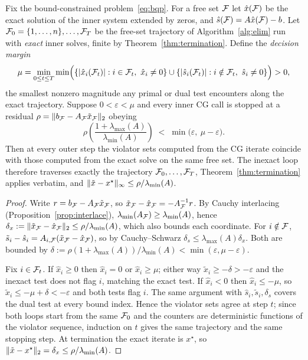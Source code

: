 \begin{lemma}
\label{lem:inexact}
Fix the bound-constrained problem~\eqref{eq:bqp}. For a free set $\mathcal{F}$ let
$\hat x(\mathcal{F})$ be the exact solution of the inner system extended by zeros, and
$\hat s(\mathcal{F}) = A\hat x(\mathcal{F}) - b$. Let $\mathcal{F}_0 = \{1,\dots,n\}, \dots, \mathcal{F}_T$
be the free-set trajectory of Algorithm~\ref{alg:elim} run with \emph{exact} inner
solves, finite by Theorem~\ref{thm:termination}. Define the \emph{decision margin}
\[
  \mu = \min_{0 \le t \le T} \min\Bigl(
    \{ |\hat x_i(\mathcal{F}_t)| : i \in \mathcal{F}_t,\ \hat x_i \ne 0 \}
    \cup
    \{ |\hat s_i(\mathcal{F}_t)| : i \notin \mathcal{F}_t,\ \hat s_i \ne 0 \}
  \Bigr) > 0,
\]
the smallest nonzero magnitude any primal or dual test encounters along the exact
trajectory. Suppose $0 < \varepsilon < \mu$ and every inner CG call is stopped at a
residual $\rho = \lVert b_{\mathcal{F}} - A_{\mathcal{F}}\tilde x_{\mathcal{F}} \rVert_2$ obeying
\begin{equation}
  \rho\left(\frac{1 + \lambda_{\max}(A)}{\lambda_{\min}(A)}\right)
  \;<\; \min\bigl(\varepsilon,\ \mu - \varepsilon\bigr).
  \label{eq:inexactcond}
\end{equation}
Then at every outer step the violator sets computed from the CG iterate coincide
with those computed from the exact solve on the same free set. The inexact loop
therefore traverses exactly the trajectory $\mathcal{F}_0,\dots,\mathcal{F}_T$,
Theorem~\ref{thm:termination} applies verbatim, and
$\lVert \tilde x - x^\star \rVert_\infty \le \rho/\lambda_{\min}(A)$.
\end{lemma}

\begin{proof}
Write $r = b_{\mathcal{F}} - A_{\mathcal{F}}\tilde x_{\mathcal{F}}$, so
$\tilde x_{\mathcal{F}} - \hat x_{\mathcal{F}} = -A_{\mathcal{F}}^{-1}r$. By Cauchy interlacing
(Proposition~\ref{prop:interlace}), $\lambda_{\min}(A_{\mathcal{F}}) \ge \lambda_{\min}(A)$,
hence
$\delta_x := \lVert \tilde x_{\mathcal{F}} - \hat x_{\mathcal{F}} \rVert_2 \le \rho/\lambda_{\min}(A)$,
which also bounds each coordinate. For $i \notin \mathcal{F}$,
$\tilde s_i - \hat s_i = A_{i,\mathcal{F}}(\tilde x_{\mathcal{F}} - \hat x_{\mathcal{F}})$, so by
Cauchy--Schwarz $\delta_s \le \lambda_{\max}(A)\delta_x$. Both are bounded by
$\delta := \rho(1+\lambda_{\max}(A))/\lambda_{\min}(A) < \min(\varepsilon,\mu-\varepsilon)$.

Fix $i \in \mathcal{F}_t$. If $\hat x_i \ge 0$ then $\hat x_i = 0$ or $\hat x_i \ge \mu$;
either way $\tilde x_i \ge -\delta > -\varepsilon$ and the inexact test does not flag
$i$, matching the exact test. If $\hat x_i < 0$ then $\hat x_i \le -\mu$, so
$\tilde x_i \le -\mu + \delta < -\varepsilon$ and both tests flag $i$. The same
argument with $\hat s_i, \tilde s_i, \delta_s$ covers the dual test at every bound
index. Hence the violator sets agree at step $t$; since both loops start from the
same $\mathcal{F}_0$ and the counters are deterministic functions of the violator
sequence, induction on $t$ gives the same trajectory and the same stopping step. At
termination the exact iterate is $x^\star$, so
$\lVert \tilde x - x^\star \rVert_2 = \delta_x \le \rho/\lambda_{\min}(A)$.
\end{proof}

